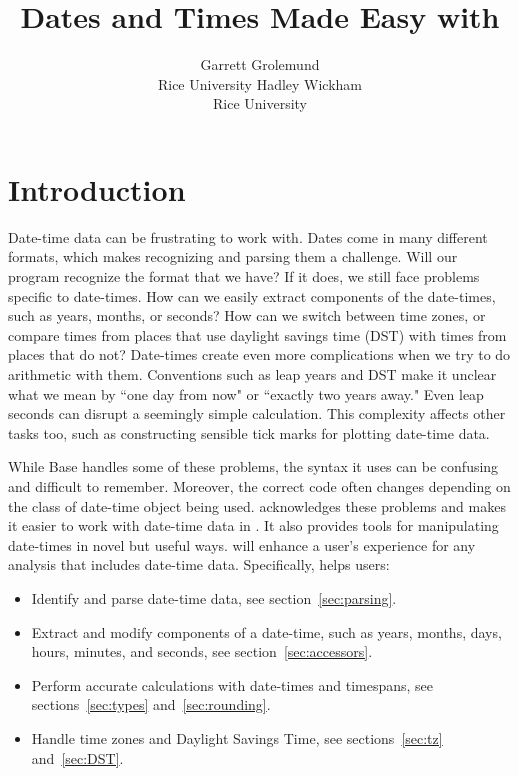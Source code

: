 \documentclass[article]{jss}
\author{Garrett Grolemund\\Rice University \And 
        Hadley Wickham\\Rice University}
\title{Dates and Times Made Easy with \pkg{lubridate}}
\begin{document}
\section{Introduction}

Date-time data can be frustrating to work with. Dates come in many different formats, which makes recognizing and parsing them a challenge. Will our program recognize the format that we have? If it does, we still face problems specific to date-times. How can we easily extract components of the date-times, such as years, months, or seconds? How can we switch between time zones, or compare times from places that use daylight savings time (DST) with times from places that do not? Date-times create even more complications when we try to do arithmetic with them. Conventions such as leap years and DST make it unclear what we mean by ``one day from now" or ``exactly two years away."  Even leap seconds can disrupt a seemingly simple calculation.  This complexity affects other tasks too, such as constructing sensible tick marks for plotting date-time data.

While Base  \citep{R} handles some of these problems, the syntax it uses can be confusing and difficult to remember. Moreover, the correct  code often changes depending on the class of date-time object being used.  acknowledges these problems and makes it easier to work with date-time data in . It also provides tools for manipulating date-times in novel but useful ways.  will enhance a user's experience for any analysis that includes date-time data. Specifically,  helps users:

\begin{itemize}
   \item Identify and parse date-time data, see section~\ref{sec:parsing}.
   
    \item Extract and modify components of a date-time, such as years, months, days, hours, minutes, and seconds, see section~\ref{sec:accessors}.
  
  \item Perform accurate calculations with date-times and timespans, see sections~\ref{sec:types} and~\ref{sec:rounding}.
    
  \item Handle time zones and Daylight Savings Time, see sections~\ref{sec:tz} and~\ref{sec:DST}.
  
\end{itemize}
\end{document}
